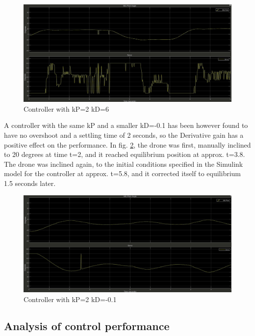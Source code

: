 \begin{figure}[H]
    \centering
    \includegraphics[scale=0.25]{graphics/Control/p2d6_Moment(3).jpg}
    \caption{Controller with kP=2 kD=6}
     \label{fig:Controller with kP=2 kD=6}
\end{figure} 

A controller with the same kP and a smaller kD=-0.1 has been however found to have no overshoot and a settling time of 2 seconds, so the Derivative gain has a positive effect on the performance. In fig. \ref{fig:Controller with kP=2 kD=-0.1}, the drone was first, manually inclined to 20 degrees at time t=2, and it reached equilibrium position at approx. t=3.8. The drone was inclined again, to the initial conditions specified in the Simulink model for the controller at approx. t=5.8, and it corrected itself to equilibrium 1.5 seconds later.

\begin{figure}[H]
    \centering
    \includegraphics[scale=0.25]{graphics/Control/p2dminus01_Moment.jpg}
    \caption{Controller with kP=2 kD=-0.1}
     \label{fig:Controller with kP=2 kD=-0.1}
\end{figure} 

\subsection{Analysis of control performance}

